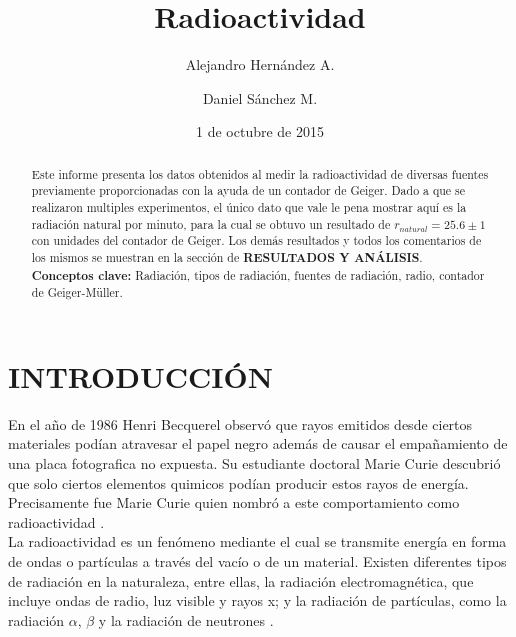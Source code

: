 \documentclass[prb,aps,twocolumn,preprintnumbers,amsmath,amssymb]{revtex4}
\begin{document}
\title{Radioactividad}%

\author{Alejandro Hernández A.}%
\author{Daniel Sánchez M.}%
%

\date{1 de octubre de 2015}%

\begin{abstract}
Este informe presenta los datos obtenidos al medir la radioactividad de diversas fuentes previamente proporcionadas con la ayuda de un contador de Geiger. Dado a que se realizaron multiples experimentos, el único dato que vale le pena mostrar aquí es la radiación natural por minuto, para la cual se obtuvo un resultado de $r_{natural} = 25.6 \pm 1$ con unidades del contador de Geiger. Los demás resultados y todos los comentarios de los mismos se muestran en la sección de \textbf{RESULTADOS Y ANÁLISIS}.\\

\noindent \textbf{Conceptos clave:} Radiación, tipos de radiación, fuentes de radiación, radio, contador de Geiger-Müller.
\end{abstract}
                             
\maketitle

\section{INTRODUCCIÓN}
En el año de 1986 Henri Becquerel observó que rayos emitidos desde ciertos materiales podían atravesar el papel negro además de causar el empañamiento de una placa fotografica no expuesta. Su estudiante doctoral Marie Curie descubrió que solo ciertos elementos quimicos podían producir estos rayos de energía. Precisamente fue Marie Curie quien nombró a este comportamiento como radioactividad \cite{wikipedia}. \\

La radioactividad es un fenómeno mediante el cual se transmite energía en forma de ondas o partículas a través del vacío o de un material. Existen diferentes tipos de radiación en la naturaleza, entre ellas, la radiación electromagnética, que incluye ondas de radio, luz visible y rayos x; y la 	radiación de partículas, como la radiación $\alpha$, $\beta$ y la radiación de neutrones \cite{wikipedia}.\\
\end{document}
